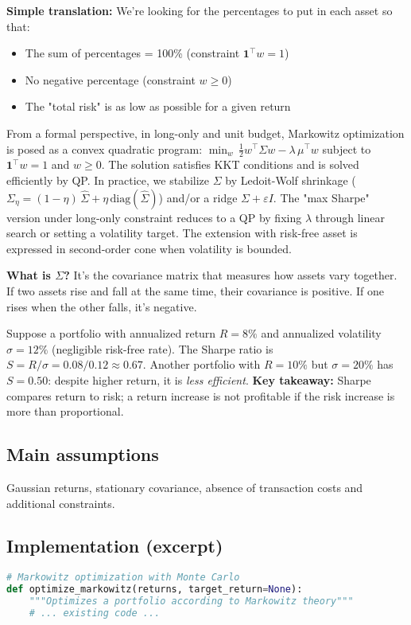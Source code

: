\documentclass[11pt,a4paper]{article}
\begin{document}
\textbf{Simple translation:} We're looking for the percentages to put in each asset so that:
\begin{itemize}
\item The sum of percentages = 100\% (constraint \(\mathbf{1}^\top w = 1\))
\item No negative percentage (constraint \(w \ge 0\))
\item The "total risk" is as low as possible for a given return
\end{itemize}
\noindent From a formal perspective, in long-only and unit budget, Markowitz optimization is posed as a convex quadratic program: \(\min_w\, \frac{1}{2} w^\top \Sigma w - \lambda \, \mu^\top w\) subject to \(\mathbf{1}^\top w=1\) and \(w\ge 0\). The solution satisfies KKT conditions and is solved efficiently by QP. In practice, we stabilize \(\Sigma\) by Ledoit-Wolf shrinkage (\(\Sigma_\eta=(1-\eta)\,\hat\Sigma + \eta \, \text{diag}(\hat\Sigma)\)) and/or a ridge \(\Sigma+\varepsilon I\). The "max Sharpe" version under long-only constraint reduces to a QP by fixing \(\lambda\) through linear search or setting a volatility target. The extension with risk-free asset is expressed in second-order cone when volatility is bounded.

\textbf{What is \(\Sigma\)?} It's the covariance matrix that measures how assets vary together. If two assets rise and fall at the same time, their covariance is positive. If one rises when the other falls, it's negative.

\begin{tcolorbox}[title=Numeric example — Sharpe ratio]
Suppose a portfolio with annualized return \(R=8\%\) and annualized volatility \(\sigma=12\%\) (negligible risk-free rate). The Sharpe ratio is \(S = R/\sigma = 0.08/0.12 \approx 0.67\). Another portfolio with \(R=10\%\) but \(\sigma=20\%\) has \(S=0.50\): despite higher return, it is \emph{less efficient}. \textbf{Key takeaway:} Sharpe compares return to risk; a return increase is not profitable if the risk increase is more than proportional.
\end{tcolorbox}

\subsection{Main assumptions}
Gaussian returns, stationary covariance, absence of transaction costs and additional constraints.

\subsection{Implementation (excerpt)}
\begin{lstlisting}[language=Python,caption={Markowitz - File: \texttt{src/markowitz.py}}]
# Markowitz optimization with Monte Carlo
def optimize_markowitz(returns, target_return=None):
    """Optimizes a portfolio according to Markowitz theory"""
    # ... existing code ...
\end{lstlisting}
\end{document}
